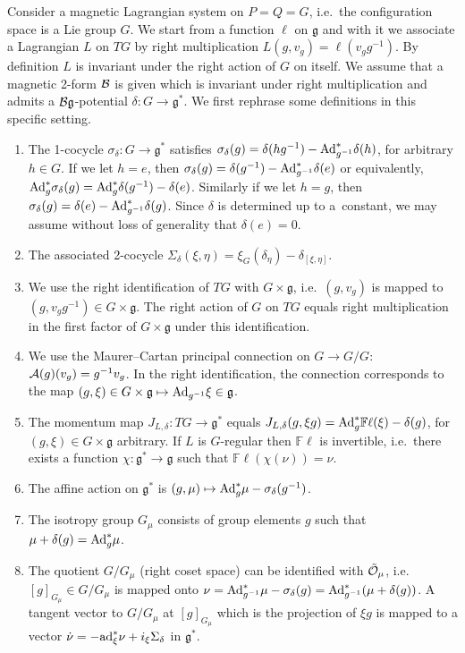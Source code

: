 \documentclass[pdftex]{sigma}
\newcommand{\A}{{\cal A}}
\newcommand{\B}{{\cal B}}
\newcommand{\lag}{\mathfrak{g}}
\newcommand{\Or}{{\cal O}}
\newcommand{\F}{\mathbb{F}}
\begin{document}
Consider a magnetic Lagrangian system on $P=Q=G$, i.e.\ the conf\/iguration space is a Lie group $G$. We start from a function $\ell$ on $\lag$ and with it we associate a Lagrangian $L$ on $TG$ by right multiplication $L(g,v_g)=\ell(v_g g^{-1})$. By def\/inition $L$ is invariant under the right action of $G$ on itself. We assume that a magnetic 2-form $\B$ is given which is invariant under right multiplication and admits a $\B\lag$-potential $\delta:G\to \lag^*$. We f\/irst rephrase some def\/initions in this specif\/ic setting.

\begin{enumerate}\itemsep=0pt
\item The 1-cocycle $\sigma_\delta: G\to \lag^*$ satisf\/ies $\sigma_\delta(g) = \delta(hg^{-1})- {\rm Ad}^*_{g^{-1}} \delta(h)$, for arbitrary $h\in G$. If we let $h=e$, then $\sigma_\delta(g) = \delta(g^{-1}) - {\rm Ad}^*_{g^{-1}} \delta(e)$ or equivalently, ${\rm Ad}^*_{g}\sigma_\delta(g) ={\rm Ad}^*_{g} \delta(g^{-1}) - \delta(e)$. Similarly if we let $h=g$, then $\sigma_\delta(g) = \delta(e) - {\rm Ad}^*_{g^{-1}} \delta(g)$. Since $\delta$ is determined up to a~constant, we may assume without loss of generality that $\delta(e)=0$.
\item The associated 2-cocycle $\Sigma_\delta(\xi,\eta) =  \xi_G(\delta_\eta) - \delta_{[\xi,\eta]}$.
\item We use the right identif\/ication of $TG$ with $G\times\lag$, i.e.\ $(g,v_g)$ is mapped to $(g,v_gg^{-1})\in G\times\lag$. The right action of $G$ on $TG$ equals right multiplication in the f\/irst factor of $G\times\lag$ under this identif\/ication.
\item We use the Maurer--Cartan principal connection on $G\to G/G$: $\A(g)(v_g) = g^{-1} v_g$. In the right identif\/ication, the connection corresponds to the map $(g,\xi)\in G\times\lag \mapsto {\rm Ad}_{g^{-1}} \xi\in\lag$.
\item The momentum map $J_{L,\delta}:TG\to \lag^*$ equals $J_{L,\delta}(g,\xi g) = {\rm Ad}^*_{g} \F \ell (\xi)-\delta(g)$, for $(g,\xi)\in G\times \lag$ arbitrary. If $L$ is $G$-regular then $\F\ell$ is invertible, i.e.\ there exists a function $\chi: \lag^*\to \lag$ such that $\F\ell( \chi (\nu)) = \nu$.
\item The af\/f\/ine action on $\lag^*$ is $(g,\mu)\mapsto {\rm Ad}^*_{g} \mu - \sigma_\delta(g^{-1})$.
\item The isotropy group $G_\mu$ consists of group elements $g$ such that $\mu +\delta(g) = {\rm Ad}^*_g\mu$.
\item The quotient $G/G_\mu$ (right coset space) can be identif\/ied with $\tilde\Or_\mu$, i.e.\ $[g]_{G_\mu}
 \in G/G_\mu$ is mapped onto $\nu={\rm Ad}_{g^{-1}}^*\mu - \sigma_\delta(g)={\rm Ad}^*_{g^{-1}}(\mu+\delta(g)) $. A tangent vector to $G/G_\mu$ at $[g]_{G_\mu}$ which is the projection of $\xi g$ is mapped to a vector $\dot \nu = -{\rm ad}_\xi^*\nu + i_\xi \Sigma_\delta$ in $\lag^*$.
\end{enumerate}
\end{document}
